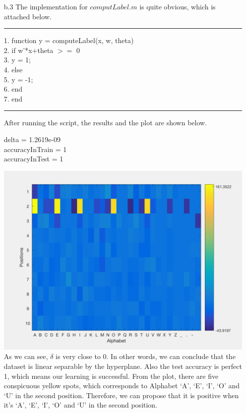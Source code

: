 \begin{enumerate}
\begin{enumerate}
	\item[b.3]
	The implementation for $computLabel.m$ is quite obvious, which is attached below.\\	
	\noindent\rule[0.5ex]{\linewidth}{1pt}
	1.	function y = computeLabel(x, w, theta)\\
    	2.	\qquad if w'*x+theta $>=$ 0\\
        3.	\qquad \qquad y = 1;\\
    	4.	\qquad else\\
        5.	\qquad \qquad y = -1;\\
    	6.	\qquad end\\
	7.	end\\
	\noindent\rule[0.5ex]{\linewidth}{1pt}
	After running the script, the results and the plot are shown below. \\
	\begin{center}
	delta = 1.2619e-09\\
	accuracyInTrain = 1\\
	accuracyInTest = 1
	\end{center}
	\includegraphics[scale = 0.7]{p3b3}\\
	As we can see, $\delta$ is very close to 0. In other words, we can conclude that the dataset is linear separable by the hyperplane. Also the test accuracy is perfect 1, which means our learning is successful. From the plot, there are five conspicuous yellow spots, which corresponds to Alphabet `A', `E', `I', `O' and `U' in the second position. Therefore, we can propose that it is positive when it's `A', `E', `I', `O' and `U' in the second position. 
	

\end{enumerate}
\end{enumerate}
